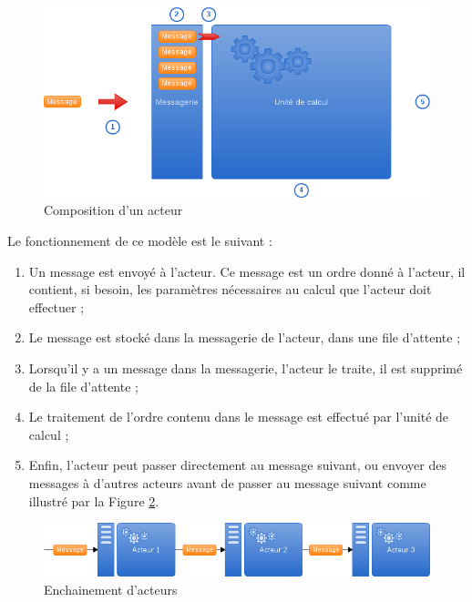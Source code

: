 \begin{figure}[h]
\begin{center}
\includegraphics[width=400pt]{img/acteur.png}
\end{center}
\caption{Composition d'un acteur}
\label{actor}
\end{figure}

Le fonctionnement de ce modèle est le suivant :
\begin{enumerate}
  \item Un message est envoyé à l'acteur. Ce message est un ordre donné à l'acteur, il contient, si besoin, les paramètres nécessaires au calcul que l'acteur doit effectuer ;
  \item Le message est stocké dans la messagerie de l'acteur, dans une file d'attente ;
  \item Lorsqu'il y a un message dans la messagerie, l'acteur le traite, il est supprimé de la file d'attente ;
  \item Le traitement de l'ordre contenu dans le message est effectué par l'unité de calcul ;
  \item Enfin, l'acteur peut passer directement au message suivant, ou envoyer des messages à d'autres acteurs avant de passer au message suivant comme illustré par la Figure \ref{actors}.
\end{enumerate}

\begin{figure}[h]
\begin{center}
\includegraphics[width=400pt]{img/acteurs.png}
\end{center}
\caption{Enchainement d'acteurs}
\label{actors}
\end{figure}

